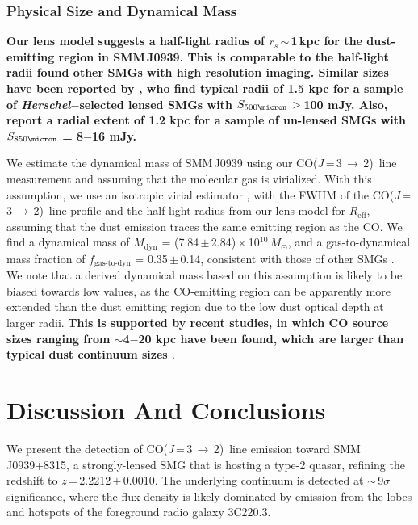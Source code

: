 \documentclass[iop, revtex4]{emulateapj}
\newcommand{\Msun}{\mbox{$M_{\odot}$}}
\newcommand{\CO}{\mbox{CO($J$\,=\,3\,$\rightarrow$\,2) }}
\newcommand{\eg}{{\sl e.g.,~}}
\begin{document}
\subsubsection{Physical Size and Dynamical Mass}
{\bf 
Our lens model suggests a half-light radius of $r_s$\,$\sim$\,1\,kpc for the dust-emitting region in SMM\,J0939. This is comparable to the half-light radii found other SMGs with high resolution imaging. Similar sizes have been reported by \citet{Bussmann13a}, who find typical radii of 1.5 kpc for a sample of {\it Herschel}$-$selected lensed SMGs with $S_{500\micron}\,>$\,100 mJy. 
Also, \citet{Simpson15a} report a radial extent of 1.2 kpc for a sample of un-lensed SMGs with $S_{850\micron}$ = 8$-$16 mJy.}

We estimate the dynamical mass of SMM\,J0939 using our \CO line measurement and assuming that the molecular gas is virialized. With this assumption, we use an isotropic virial estimator \citep[\eg][]{Engel10a}, with the FWHM of the \CO line profile and the half-light radius from our lens model for $R_\textrm{eff}$, assuming that the dust emission traces the same emitting region as the CO. 
We find a dynamical mass of $M_\textrm{dyn}$ = (7.84\,$\pm$\,2.84)\,$\times$\,10$^{10}$\,\Msun, and a gas-to-dynamical mass fraction of $f_\textrm{gas-to-dyn}$ = 0.35\,$\pm$\,0.14, consistent with those of other SMGs \citep{Tacconi06a}.  We note that a derived dynamical mass based on this assumption is likely to be biased towards low values, as the CO-emitting region can be apparently more extended than the dust emitting region 
 due to the low dust optical depth at larger radii. 
{\bf This is supported by recent studies, in which CO source sizes ranging from $\sim$4$-$20 kpc have been found, which are larger than typical dust continuum sizes \citep{Tacconi06a, Riechers11c, Ivison11a, Hodge13a, Hodge15a}}. 

\section{Discussion And Conclusions}
We present the detection of \CO line emission toward SMM\,J0939+8315, a strongly-lensed SMG that is hosting a type-2 quasar, refining the redshift
to $z$\,=\,2.2212\,$\pm$\,0.0010. The underlying continuum is detected at $\sim$\,9$\sigma$ significance, where the flux density is likely dominated by emission from the lobes and hotspots of the foreground radio galaxy 3C220.3.
\end{document}
